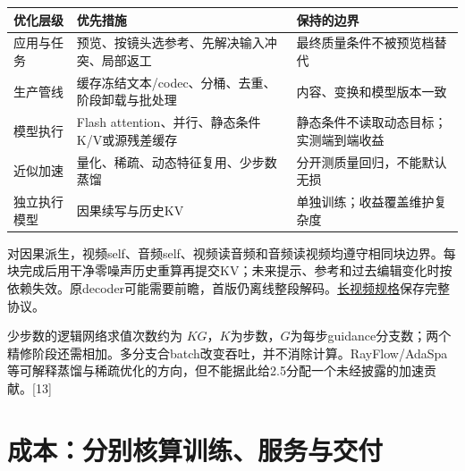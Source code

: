 {\def\LTcaptype{table} %
\small\setlength{\tabcolsep}{3pt}\renewcommand{\arraystretch}{1.18}
\begin{longtable}[]{@{}
  >{\raggedright\arraybackslash}p{}
  >{\raggedright\arraybackslash}p{}
  >{\raggedright\arraybackslash}p{}@{}}
\toprule\noalign{}
\begin{minipage}[b]{\linewidth}\raggedright
优化层级
\end{minipage} & \begin{minipage}[b]{\linewidth}\raggedright
优先措施
\end{minipage} & \begin{minipage}[b]{\linewidth}\raggedright
保持的边界
\end{minipage} \\
\midrule\noalign{}
\endhead
\bottomrule\noalign{}
\endlastfoot
应用与任务 & 预览、按镜头选参考、先解决输入冲突、局部返工 & 最终质量条件不被预览档替代 \\
生产管线 & 缓存冻结文本/codec、分桶、去重、阶段卸载与批处理 & 内容、变换和模型版本一致 \\
模型执行 & Flash attention、并行、静态条件K/V或源残差缓存 & 静态条件不读取动态目标；实测端到端收益 \\
近似加速 & 量化、稀疏、动态特征复用、少步数蒸馏 & 分开测质量回归，不能默认无损 \\
独立执行模型 & 因果续写与历史KV & 单独训练；收益覆盖维护复杂度 \\
\end{longtable}
}

对因果派生，视频self、音频self、视频读音频和音频读视频均遵守相同块边界。每块完成后用干净零噪声历史重算再提交KV；未来提示、参考和过去编辑变化时按依赖失效。原decoder可能需要前瞻，首版仍离线整段解码。\hyperref[seedance-m24]{长视频规格}保存完整协议。

少步数的逻辑网络求值次数约为 \(KG\)，\(K\)为步数，\(G\)为每步guidance分支数；两个精修阶段还需相加。多分支合batch改变吞吐，并不消除计算。RayFlow/AdaSpa等可解释蒸馏与稀疏优化的方向，但不能据此给2.5分配一个未经披露的加速贡献。{[}13{]}

\section{成本：分别核算训练、服务与交付}\label{seedance-m27-ux6210ux672cux5206ux522bux6838ux7b97ux8badux7ec3ux670dux52a1ux4e0eux4ea4ux4ed8}

